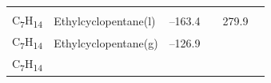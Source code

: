\documentclass[
]{book}
\theoremstyle{definition}
\theoremstyle{definition}
\theoremstyle{definition}
\theoremstyle{remark}
\begin{document}
\begin{longtable}[]{@{}llllll@{}}
\begin{minipage}[t]{0.15\columnwidth}
\strut
\end{minipage} & \begin{minipage}[t]{0.14\columnwidth}\raggedright
\strut
\end{minipage} & \begin{minipage}[t]{0.14\columnwidth}\raggedright
\strut
\end{minipage}\tabularnewline
\begin{minipage}[t]{0.07\columnwidth}\raggedright
C\textsubscript{7}H\textsubscript{14}\strut
\end{minipage} & \begin{minipage}[t]{0.17\columnwidth}\raggedright
Ethylcyclopentane(l)\strut
\end{minipage} & \begin{minipage}[t]{0.15\columnwidth}\raggedright
--163.4\strut
\end{minipage} & \begin{minipage}[t]{0.15\columnwidth}\raggedright
\strut
\end{minipage} & \begin{minipage}[t]{0.14\columnwidth}\raggedright
279.9\strut
\end{minipage} & \begin{minipage}[t]{0.14\columnwidth}\raggedright
\strut
\end{minipage}\tabularnewline
\begin{minipage}[t]{0.07\columnwidth}\raggedright
C\textsubscript{7}H\textsubscript{14}\strut
\end{minipage} & \begin{minipage}[t]{0.17\columnwidth}\raggedright
Ethylcyclopentane(g)\strut
\end{minipage} & \begin{minipage}[t]{0.15\columnwidth}\raggedright
--126.9\strut
\end{minipage} & \begin{minipage}[t]{0.15\columnwidth}\raggedright
\strut
\end{minipage} & \begin{minipage}[t]{0.14\columnwidth}\raggedright
\strut
\end{minipage} & \begin{minipage}[t]{0.14\columnwidth}\raggedright
\strut
\end{minipage}\tabularnewline
\begin{minipage}[t]{0.07\columnwidth}\raggedright
C\textsubscript{7}H\textsubscript{14}\strut
\end{minipage} & \begin{minipage}[t]{0.17\columnwidth}\raggedright

\end{minipage}
\end{longtable}
\end{document}
